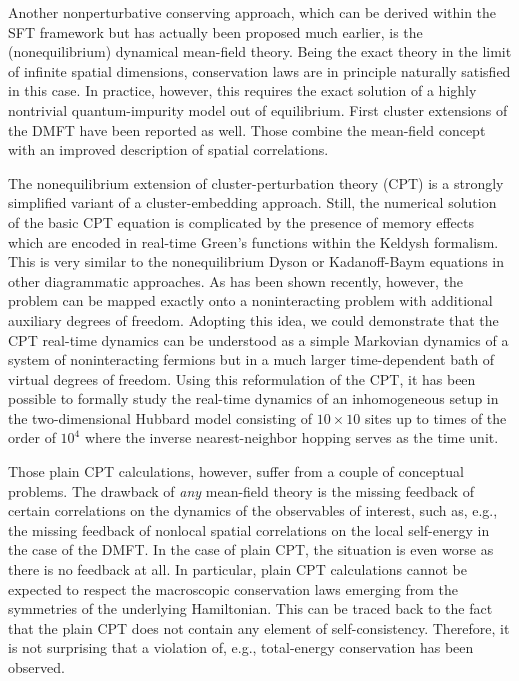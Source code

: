 \documentclass[twocolumn,prb,showpacs,aps,superscriptaddress]{revtex4}
\begin{document}
Another nonperturbative conserving approach, which can be derived within the
SFT framework but has actually been proposed much earlier, is the
(nonequilibrium) dynamical mean-field theory. \cite{SM02,FTZ06,ATE+14} Being
the exact theory in the limit of infinite spatial dimensions, conservation laws
are in principle naturally satisfied in this case.  In practice, however, this
requires the exact solution of a highly nontrivial quantum-impurity model out
of equilibrium.  First cluster extensions of the DMFT have been reported as
well. \cite{TBAP14,HTEP16} Those combine the mean-field concept with an
improved description of spatial correlations.

The nonequilibrium extension \cite{BP11,JP13,GP15} of cluster-perturbation
theory (CPT) \cite{SPPL00,GV93} is a strongly simplified variant of a
cluster-embedding approach.  Still, the numerical solution of the basic CPT
equation is complicated by the presence of memory effects which are encoded in
real-time Green's functions within the Keldysh formalism.  This is very similar
to the nonequilibrium Dyson or Kadanoff-Baym equations in other diagrammatic
approaches. As has been shown recently, \cite{GBEK13,BE14} however, the
problem can be mapped exactly onto a noninteracting problem with additional
auxiliary degrees of freedom.  Adopting this idea, we could demonstrate
\cite{GP15} that the CPT real-time dynamics can be understood as a simple
Markovian dynamics of a system of noninteracting fermions but in a much larger
time-dependent bath of virtual degrees of freedom.  Using this reformulation of
the CPT, it has been possible to formally study the real-time dynamics of an
inhomogeneous setup in the two-dimensional Hubbard model consisting of
$10\times 10$ sites up to times of the order of $10^{4}$ where the inverse
nearest-neighbor hopping serves as the time unit. 

Those plain CPT calculations, however, suffer from a couple of conceptual
problems.  The drawback of {\em any} mean-field theory is the missing feedback
of certain correlations on the dynamics of the observables of interest, such
as, e.g., the missing feedback of nonlocal spatial correlations on the local
self-energy in the case of the DMFT.  In the case of plain CPT, the situation
is even worse as there is no feedback at all.  In particular, plain CPT
calculations cannot be expected to respect the macroscopic conservation laws
emerging from the symmetries of the underlying Hamiltonian.  This can be traced
back to the fact that the plain CPT does not contain any element of
self-consistency.  Therefore, it is not surprising that a violation of, e.g.,
total-energy conservation has been observed. \cite{GP15}
\end{document}
